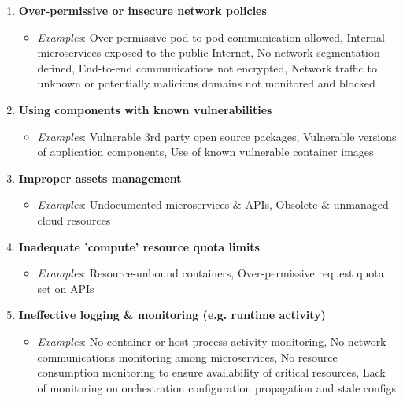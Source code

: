 \begin{enumerate}
\begin{itemize}
    \end{itemize}
    \item \textbf{Over-permissive or insecure network policies}
    \begin{itemize}
        \item \textit{Examples}: Over-permissive pod to pod communication allowed, Internal microservices exposed to the public Internet, No network segmentation defined, End-to-end communications not encrypted, Network traffic to unknown or potentially malicious domains not monitored and blocked\\
    \end{itemize}
    \item \textbf{Using components with known vulnerabilities}
    \begin{itemize}
        \item \textit{Examples}: Vulnerable 3rd party open source packages, Vulnerable versions of application components, Use of known vulnerable container images\\
    \end{itemize}
    \item \textbf{Improper assets management}
    \begin{itemize}
        \item \textit{Examples}: Undocumented microservices \& APIs, Obsolete \& unmanaged cloud resources\\
    \end{itemize}
    \item \textbf{Inadequate 'compute' resource quota limits}
    \begin{itemize}
        \item \textit{Examples}: Resource-unbound containers, Over-permissive request quota set on APIs\\
    \end{itemize}
    \item \textbf{Ineffective logging \& monitoring (e.g. runtime activity)}
    \begin{itemize}
        \item \textit{Examples}: No container or host process activity monitoring, No network communications monitoring among microservices, No resource consumption monitoring to ensure availability of critical resources, Lack of monitoring on orchestration configuration propagation and stale configs
    \end{itemize}
\end{enumerate}

